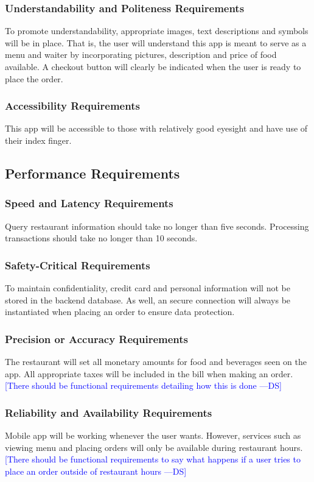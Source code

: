 \documentclass[12pt, titlepage]{article}
\newcommand{\authornote}[3]{\textcolor{#1}{[#3 ---#2]}}
\newcommand{\authornote}[3]{}
\newcommand{\ds}[1]{\authornote{blue}{DS}{#1}}
\begin{document}
\subsubsection{Understandability and Politeness Requirements}
To promote understandability, appropriate images, text descriptions and symbols will be in place. That is, the user will understand this app is meant to serve as a menu and waiter by incorporating pictures, description and price of food available. A checkout button will clearly be indicated when the user is ready to place the order.
\subsubsection{Accessibility Requirements}
This app will be accessible to those with relatively good
eyesight and have use of their index finger. 
 
\subsection{Performance Requirements}

\subsubsection{Speed and Latency Requirements}
Query restaurant information should take no longer than
five seconds. Processing transactions should take no longer than
10 seconds.  

\subsubsection{Safety-Critical Requirements}
To maintain confidentiality, credit card and personal information will not be stored in the backend database. As well, an secure connection will always be instantiated when placing an order to ensure data protection. 

\subsubsection{Precision or Accuracy Requirements}
The restaurant will set all monetary amounts for food and beverages seen on the app. All appropriate taxes will be included in the bill when making an order.  
\ds{There should be functional requirements detailing how this is done}
\subsubsection{Reliability and Availability Requirements}
Mobile app will be working whenever the user wants. However, services such as viewing menu and placing orders will only be available during restaurant hours.
\ds{There should be functional requirements to say what happens if a user
tries to place an order outside of restaurant hours}
\end{document}
